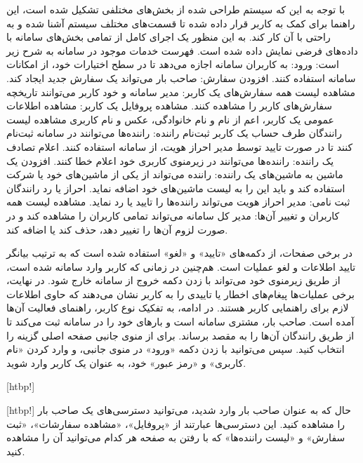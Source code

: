 
با توجه به این که سیستم طراحی شده از بخش‌های مختلفی تشکیل شده است، این راهنما برای کمک به کاربر قرار داده شده تا قسمت‌های مختلف سیستم آشنا شده و به راحتی با آن کار کند. به این منظور یک اجرای کامل از تمامی بخش‌های سامانه با داده‌های فرضی نمایش داده شده است. فهرست خدمات موجود در سامانه به شرح زیر است:
	 ورود: به کاربران سامانه اجازه می‌دهد تا در سطح اختیارات خود، از امکانات سامانه استفاده کنند.
	 افزودن سفارش: صاحب بار می‌تواند یک سفارش جدید ایجاد کند.
	 مشاهده لیست همه سفارش‌های یک کاربر: مدیر سامانه و خود کاربر می‌توانند تاریخچه سفارش‌های کاربر را مشاهده کنند.
	 مشاهده پروفایل یک کاربر: مشاهده اطلاعات عمومی یک کاربر، اعم از نام و نام خانوادگی، عکس و نام کاربری
	 مشاهده لیست رانندگان طرف حساب یک کاربر
	 ثبت‌نام راننده: راننده‌ها می‌توانند در سامانه ثبت‌نام کنند تا در صورت تایید توسط مدیر احراز هویت، از سامانه استفاده کنند.
	 اعلام تصادف یک راننده: راننده‌ها می‌توانند در زیرمنوی کاربری خود اعلام خطا کنند.
	 افزودن یک ماشین به ماشین‌های یک راننده: راننده می‌تواند از یکی از ماشین‌های خود یا شرکت استفاده کند و باید این را به لیست ماشین‌های خود اضافه نماید.
	 احراز یا رد رانندگان ثبت نامی: مدیر احراز هویت می‌تواند راننده‌ها را تایید یا رد نماید.
	 مشاهده لیست همه کاربران و تغییر آن‌ها: مدیر کل سامانه می‌تواند تمامی کاربران را مشاهده کند و در صورت لزوم آن‌ها را تغییر دهد، حذف کند یا اضافه کند.
	
در برخی صفحات، از دکمه‌های «تایید» و «لغو» استفاده شده است که به ترتیب بیانگر تایید اطلاعات و لغو عملیات است. هم‌چنین در زمانی که کاربر وارد سامانه شده است، از طریق زیرمنوی خود می‌تواند با زدن دکمه خروج از سامانه خارج شود. در نهایت، برخی عملیات‌ها پیغام‌های اخطار یا تاییدی را به کاربر نشان می‌دهند که حاوی اطلاعات لازم برای راهنمایی کاربر هستند. در ادامه، به تفکیک نوع کاربر، راهنمای فعالیت آن‌ها آمده است.
\newpage
{}
	 
			 صاحب بار، مشتری سامانه است و بارهای خود را در سامانه ثبت می‌کند تا از طریق رانندگان آن‌ها را به مقصد برساند. برای  از منوی جانبی صفحه اصلی گزینه  را انتخاب کنید. سپس می‌توانید با زدن دکمه «ورود» در منوی جانبی، و وارد کردن «نام کاربری» و «رمز عبور» خود، به عنوان یک کاربر  وارد شوید.

	[htbp!]

	[htbp!]
		 حال که به عنوان صاحب بار وارد شدید، می‌توانید دسترسی‌های یک صاحب بار را مشاهده کنید. این دسترسی‌ها عبارتند از «پروفایل»، «مشاهده سفارشات»، «ثبت سفارش» و «لیست راننده‌ها» که با رفتن به صفحه هر کدام می‌توانید آن را مشاهده کنید.

